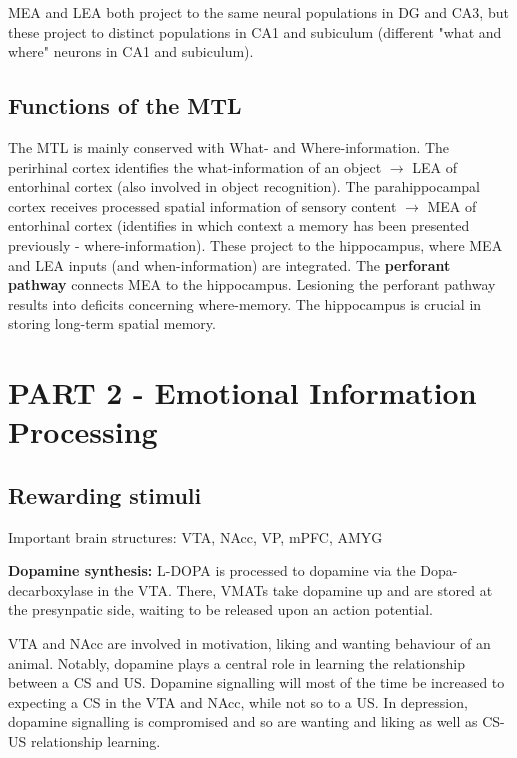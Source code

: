 \documentclass[twosided, a4paper, pt11]{article}
\begin{document}
	MEA and LEA both project to the same neural populations in DG and CA3, but these project to distinct populations in CA1 and subiculum (different "what and where" neurons in CA1 and subiculum).\newline
	
	\subsection{Functions of the MTL}
	The MTL is mainly conserved with What- and Where-information. The perirhinal cortex identifies the what-information of an object $\rightarrow$ LEA of entorhinal cortex (also involved in object recognition). The parahippocampal cortex receives processed spatial information of sensory content $\rightarrow$ MEA of entorhinal cortex (identifies in which context a memory has been presented previously - where-information). These project to the hippocampus, where MEA and LEA inputs (and when-information) are integrated. The \textbf{perforant pathway} connects MEA to the hippocampus. Lesioning the perforant pathway results into deficits concerning where-memory. The hippocampus is crucial in storing long-term spatial memory.\newline
	
	\section{PART 2 - Emotional Information Processing}
	
	\subsection{Rewarding stimuli}
	Important brain structures: VTA, NAcc, VP, mPFC, AMYG\newline
	
	\textbf{Dopamine synthesis:} L-DOPA is processed to dopamine via the Dopa-decarboxylase in the VTA. There, VMATs take dopamine up and are stored at the presynpatic side, waiting to be released upon an action potential.\newline
	
	VTA and NAcc are involved in motivation, liking and wanting behaviour of an animal. Notably, dopamine plays a central role in learning the relationship between a CS and US. Dopamine signalling will most of the time be increased to expecting a CS in the VTA and NAcc, while not so to a US. In depression, dopamine signalling is compromised and so are wanting and liking as well as CS-US relationship learning.
	
\end{document}
